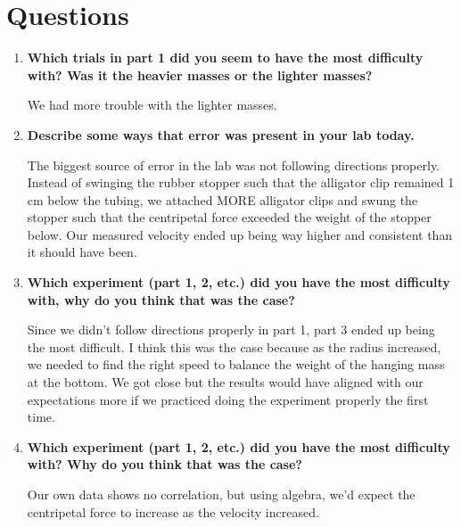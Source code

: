 
 \section{Questions}

\vspace{-0.5cm}
\singlespacing

\begin{enumerate}
	\item \textbf{Which trials in part 1 did you seem to have the most difficulty with? Was it the heavier masses or the lighter masses?}

		We had more trouble with the lighter masses. 

	\item \textbf{Describe some ways that error was present in your lab today.}
 
	The biggest source of error in the lab was not following directions properly. Instead of swinging the rubber stopper such that the alligator clip remained 1 cm below the tubing, we attached MORE alligator clips and swung the stopper such that the centripetal force exceeded the weight of the stopper below. Our measured velocity ended up being way higher and consistent than it should have been. 

\item \textbf{Which experiment (part 1, 2, etc.) did you have the most difficulty with, why do you think that was the case?}

Since we didn't follow directions properly in part 1, part 3 ended up being the most difficult. I think this was the case because as the radius increased, we needed to find the right speed to balance the weight of the hanging mass at the bottom. We got close but the results would have aligned with our expectations more if we practiced doing the experiment properly the first time.   

\item \textbf{Which experiment (part 1, 2, etc.) did you have the most difficulty with? Why do you think that was the case?}

Our own data shows no correlation, but using algebra, we'd expect the centripetal force to increase as the velocity increased. 
\end{enumerate}

\newpage
